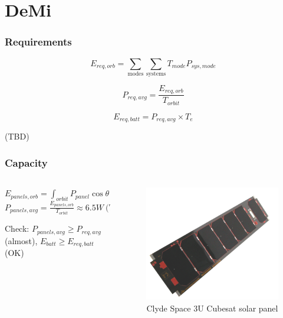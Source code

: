 \documentclass{beamer}
\begin{document}
\section{DeMi}

\begin{frame}
	\frametitle{Requirements}

		
	\[ E_{req,orb} = \sum_\text{modes}{\sum_\text{systems}{T_{mode}P_{sys,mode}}} \]
	
	\[  P_{req,avg} = \frac{E_{req,orb}}{T_{orbit}} \]
	
	\[ E_{req,batt} = P_{req,avg} \times T_e\]
	
	(TBD)
	
\end{frame}

\begin{frame}
	\frametitle{Capacity}
	\begin{columns}
	\begin{column}{0.5\textwidth}
	$ \displaystyle E_{panels,orb} = \int_{orbit}{P_{panel}\cos\theta \ dt } $
	\newline
	\newline
	$ \displaystyle P_{panels,avg} = \frac{E_{panels,orb}}{T_{orbit}} \approx 6.5 W \ \text{(TBR w/ STK)}$
	
	\begin{center}
	Check: $P_{panels,avg} \geq P_{req,avg}$ (almost), $E_{batt} \geq E_{req,batt}$	(OK)
	\end{center}
	
	\end{column}
	
	\begin{column}{0.5\textwidth}
	
	\begin{figure}%
	\includegraphics[width=\columnwidth]{img/Panel}%
	\caption{Clyde Space 3U Cubesat solar panel}%
	\label{}%
	\end{figure}
	\end{column}
	
	\end{columns}
	
\end{frame}
\end{document}
